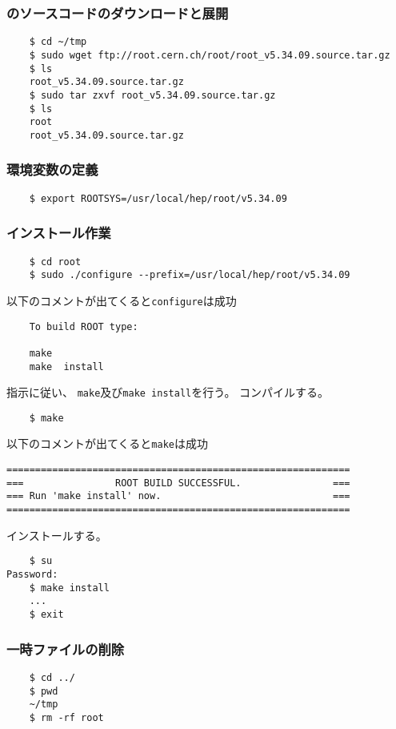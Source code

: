   \subsubsection*{\ROOT のソースコードのダウンロードと展開}
\begin{verbatim}
	$ cd ~/tmp
	$ sudo wget ftp://root.cern.ch/root/root_v5.34.09.source.tar.gz
	$ ls
	root_v5.34.09.source.tar.gz
	$ sudo tar zxvf root_v5.34.09.source.tar.gz
	$ ls
	root
	root_v5.34.09.source.tar.gz
\end{verbatim}


   \subsubsection*{環境変数の定義}
\begin{verbatim}
	$ export ROOTSYS=/usr/local/hep/root/v5.34.09
\end{verbatim}


   \subsubsection*{インストール作業}
\begin{verbatim}
	$ cd root
	$ sudo ./configure --prefix=/usr/local/hep/root/v5.34.09
\end{verbatim}
以下のコメントが出てくると\texttt{configure}は成功
\begin{verbatim}
	To build ROOT type:

	make
	make  install
\end{verbatim}
指示に従い、
\verb|make|及び\verb|make install|を行う。
コンパイルする。
\begin{verbatim}
	$ make
\end{verbatim}
以下のコメントが出てくると\texttt{make}は成功
\begin{verbatim}
============================================================
===                ROOT BUILD SUCCESSFUL.                ===
=== Run 'make install' now.                              ===
============================================================
\end{verbatim}
インストールする。
\begin{verbatim}
	$ su
Password:
	$ make install
	...
	$ exit
\end{verbatim}


\subsubsection*{一時ファイルの削除}
\begin{verbatim}
	$ cd ../
	$ pwd
	~/tmp
	$ rm -rf root
\end{verbatim}


